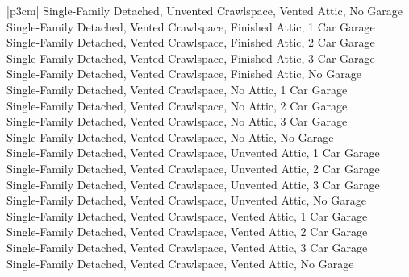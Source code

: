 \begin{customLongTable}{ |p{3cm}| }
Single-Family Detached, Unvented Crawlspace, Vented Attic, No Garage \\ \hline
Single-Family Detached, Vented Crawlspace, Finished Attic, 1 Car Garage \\ \hline
Single-Family Detached, Vented Crawlspace, Finished Attic, 2 Car Garage \\ \hline
Single-Family Detached, Vented Crawlspace, Finished Attic, 3 Car Garage \\ \hline
Single-Family Detached, Vented Crawlspace, Finished Attic, No Garage \\ \hline
Single-Family Detached, Vented Crawlspace, No Attic, 1 Car Garage \\ \hline
Single-Family Detached, Vented Crawlspace, No Attic, 2 Car Garage \\ \hline
Single-Family Detached, Vented Crawlspace, No Attic, 3 Car Garage \\ \hline
Single-Family Detached, Vented Crawlspace, No Attic, No Garage \\ \hline
Single-Family Detached, Vented Crawlspace, Unvented Attic, 1 Car Garage \\ \hline
Single-Family Detached, Vented Crawlspace, Unvented Attic, 2 Car Garage \\ \hline
Single-Family Detached, Vented Crawlspace, Unvented Attic, 3 Car Garage \\ \hline
Single-Family Detached, Vented Crawlspace, Unvented Attic, No Garage \\ \hline
Single-Family Detached, Vented Crawlspace, Vented Attic, 1 Car Garage \\ \hline
Single-Family Detached, Vented Crawlspace, Vented Attic, 2 Car Garage \\ \hline
Single-Family Detached, Vented Crawlspace, Vented Attic, 3 Car Garage \\ \hline
Single-Family Detached, Vented Crawlspace, Vented Attic, No Garage \\
\end{customLongTable}
